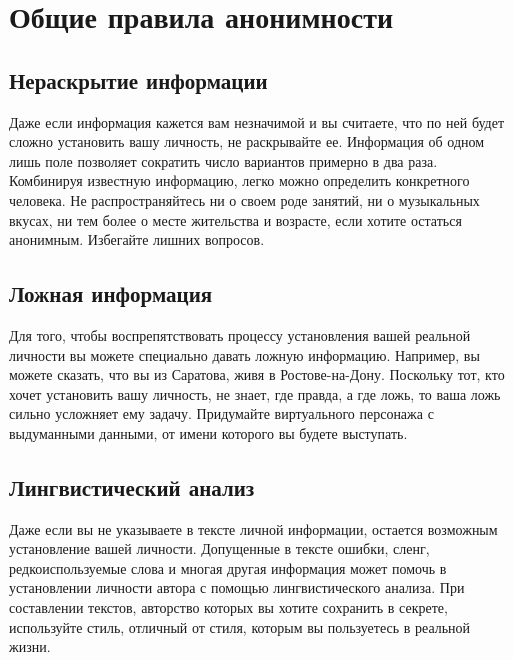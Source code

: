 \chapter{Общие правила анонимности}
\section{Нераскрытие информации}
Даже если информация кажется вам незначимой и вы считаете, что по ней будет сложно установить вашу личность, не раскрывайте ее. Информация об одном лишь поле позволяет сократить число вариантов примерно в два раза. Комбинируя известную информацию, легко можно определить конкретного человека. Не распространяйтесь ни о своем роде занятий, ни о музыкальных вкусах, ни тем более о месте жительства и возрасте, если хотите остаться анонимным. Избегайте лишних вопросов.
\section{Ложная информация}
Для того, чтобы воспрепятствовать процессу установления вашей реальной личности вы можете специально давать ложную информацию. Например, вы можете сказать, что вы из Саратова, живя в Ростове-на-Дону. Поскольку тот, кто хочет установить вашу личность, не знает, где правда, а где ложь, то ваша ложь сильно усложняет ему задачу. Придумайте виртуального персонажа с выдуманными данными, от имени которого вы будете выступать.
\section{Лингвистический анализ}
Даже если вы не указываете в тексте личной информации, остается возможным установление вашей личности. Допущенные в тексте ошибки, сленг, редкоиспользуемые слова и многая другая информация может помочь в установлении личности автора с помощью лингвистического анализа. При составлении текстов, авторство которых вы хотите сохранить в секрете, используйте стиль, отличный от стиля, которым вы пользуетесь в реальной жизни.
